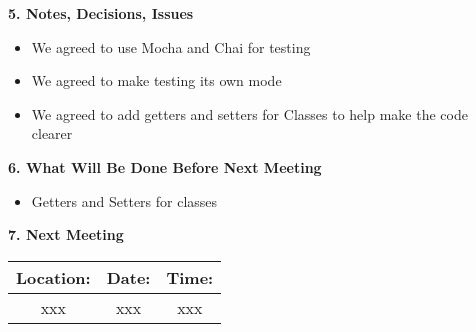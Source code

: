 \documentclass[12pt]{article}
\begin{document}
\begin{flushleft}
\textbf{5. Notes, Decisions, Issues}\\
\begin{itemize}
\item We agreed to use Mocha and Chai for testing
\item We agreed to make testing its own mode
\item We agreed to add getters and setters for Classes to help make the code clearer
\end{itemize}


\textbf{6. What Will Be Done Before Next Meeting}\\
\begin{itemize}
\item Getters and Setters for classes
\end{itemize}

\textbf{7. Next Meeting}\\
\begin{center}
 \begin{tabular}{|c | c | c |} 
\hline
 Location: & Date: & Time: \\ 
 \hline
 xxx & xxx & xxx\\
\hline
\end{tabular}
\end{center}

\end{flushleft}
\end{document}
